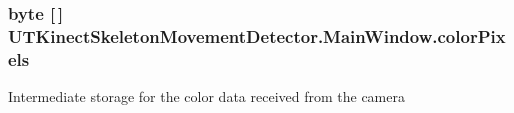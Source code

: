\hypertarget{classUTKinectSkeletonMovementDetector_1_1MainWindow_a8c2c29bff1f62d8a03e9936f577e44a8}{
\subsubsection[{color\-Pixels}]{\setlength{\rightskip}{0pt plus 5cm}byte \mbox{[}$\,$\mbox{]} U\-T\-Kinect\-Skeleton\-Movement\-Detector.\-Main\-Window.\-color\-Pixels\hspace{0.3cm}{\ttfamily [private]}}}\label{classUTKinectSkeletonMovementDetector_1_1MainWindow_a8c2c29bff1f62d8a03e9936f577e44a8}


Intermediate storage for the color data received from the camera 


